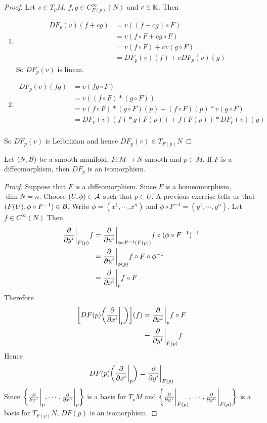 \documentclass{book}
\begin{document}
	\begin{proof}
	Let $v \in T_pM$, $f,g \in C_{F(p)}^{\infty}(N)$ and $c \in \mathbb{R}$. Then 
	\begin{enumerate}
	\item 
	\begin{align*}
		DF_p(v)(f+cg) 
		& = v((f+cg) \circ F) \\
		& = v(f \circ F + c g \circ F) \\
		& = v(f \circ F) + cv(g \circ F) \\
		& = DF_p(v)(f) + c DF_p(v)(g)
	\end{align*}
	So $DF_p(v)$ is linear.
	\item 
	\begin{align*}
	DF_p(v)(fg) 
	& = v (fg \circ F) \\
	& = v((f \circ F)* (g \circ F)) \\
	& = v(f \circ F)*(g \circ F)(p) +  (f \circ F)(p)* v(g \circ F) \\
	& = DF_p(v)(f) * g(F(p)) + f(F(p))*DF_p(v)(g) \\
	\end{align*}
	\end{enumerate}
	So $DF_p(v)$ is Leibnizian and hence $DF_p(v) \in T_{F(p)}N$
	\end{proof}

	\begin{ex}
		Let $(N, \mathcal{B})$ be a smooth manifold, $F: M \rightarrow N$ smooth and $p \in M$. If $F$ is a diffeomorphism, then $DF_p$ is an isomorphism.
	\end{ex}
	
	\begin{proof}
		Suppose that $F$ is a diffeomorphism. Since $F$ is a homeomorphism, $\dim N = n$. Choose $(U, \phi) \in \mathcal{A}$ such that $p \in U$. A previous exercise tells us that $(F(U), \phi \circ F^{-1}) \in \mathcal{B}$. Write $\phi = (x^1, \cdots, x^n)$ and $\phi \circ F^{-1} = (y^1, \cdots, y^n)$. Let $f \in C^{\infty}(N)$ Then 
		\begin{align*}
			\frac{\partial}{\partial y^i} \bigg|_{F(p)} f
			& = 	\frac{\partial}{\partial u^i} \bigg|_{\phi \circ F^{-1} (F(p))} f \circ (\phi \circ F^{-1})^{-1} \\
			& = 	\frac{\partial}{\partial u^i} \bigg|_{\phi(p)} f \circ F \circ \phi^{-1} \\
			& = 	\frac{\partial}{\partial x^i} \bigg|_p f \circ F \\
		\end{align*}
		Therefore 
		\begin{align*}
			\bigg[ DF(p) \bigg( \frac{\partial}{\partial x^i} \bigg|_p \bigg) \bigg] (f)
			& = \frac{\partial}{\partial x^i} \bigg|_p f \circ F \\
			& = \frac{\partial}{\partial y^i} \bigg|_{F(p)} f 
		\end{align*}
	Hence $$DF(p) \bigg( \frac{\partial}{\partial x^i} \bigg|_p \bigg) = \frac{\partial}{\partial y^i} \bigg|_{F(p)}$$ 
	Since $\bigg \{\frac{\partial}{\partial x^1} \bigg|_p, \cdots, \frac{\partial}{\partial x^n} \bigg|_p \bigg \}$ is a basis for $T_pM$ and $\bigg \{\frac{\partial}{\partial y^1} \bigg|_{F(p)}, \cdots, \frac{\partial}{\partial y^n} \bigg|_{F(p)} \bigg \}$ is a basis for $T_{F(p)}N$, $DF(p)$ is an isomorphism.
	\end{proof}
\end{document}
